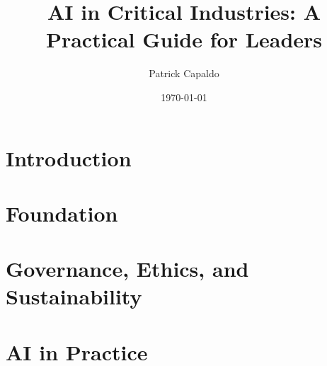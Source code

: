 \documentclass{book}
\title{AI in Critical Industries: A Practical Guide for Leaders}
\author{Patrick Capaldo}
\date{\today}
\begin{document}
\maketitle

\frontmatter
\tableofcontents

\mainmatter

\part{Introduction}


\part{Foundation}



\part{Governance, Ethics, and Sustainability}






\part{AI in Practice}





\end{document}
